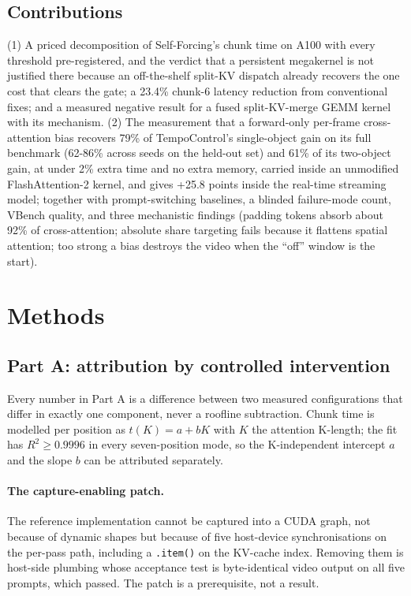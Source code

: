 \documentclass[10pt,a4paper]{article}
\begin{document}
\subsection{Contributions}
(1) A priced decomposition of Self-Forcing's chunk time on A100 with every threshold pre-registered, and the verdict that a persistent megakernel is not justified there because an off-the-shelf split-KV dispatch already recovers the one cost that clears the gate; a 23.4\% chunk-6 latency reduction from conventional fixes; and a measured negative result for a fused split-KV-merge GEMM kernel with its mechanism. (2) The measurement that a forward-only per-frame cross-attention bias recovers 79\% of TempoControl's single-object gain on its full benchmark (62-86\% across seeds on the held-out set) and 61\% of its two-object gain, at under 2\% extra time and no extra memory, carried inside an unmodified FlashAttention-2 kernel, and gives +25.8 points inside the real-time streaming model; together with prompt-switching baselines, a blinded failure-mode count, VBench quality, and three mechanistic findings (padding tokens absorb about 92\% of cross-attention; absolute share targeting fails because it flattens spatial attention; too strong a bias destroys the video when the ``off'' window is the start).

\section{Methods}

\subsection{Part A: attribution by controlled intervention}
Every number in Part A is a difference between two measured configurations that differ in exactly one component, never a roofline subtraction. Chunk time is modelled per position as $t(K)=a+bK$ with $K$ the attention K-length; the fit has $R^2\ge0.9996$ in every seven-position mode, so the K-independent intercept $a$ and the slope $b$ can be attributed separately.

\paragraph{The capture-enabling patch.} The reference implementation cannot be captured into a CUDA graph, not because of dynamic shapes but because of five host-device synchronisations on the per-pass path, including a \texttt{.item()} on the KV-cache index. Removing them is host-side plumbing whose acceptance test is byte-identical video output on all five prompts, which passed. The patch is a prerequisite, not a result.
\end{document}
